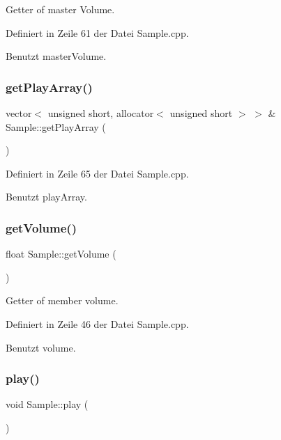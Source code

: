 Getter of master Volume. 



Definiert in Zeile 61 der Datei Sample.\+cpp.



Benutzt master\+Volume.

\mbox{\label{class_sample_a5728b28ce6f6ee19a1b84eddded4fa97}} 
\subsubsection{\texorpdfstring{get\+Play\+Array()}{getPlayArray()}}
{\footnotesize\ttfamily vector$<$ unsigned short, allocator$<$ unsigned short $>$ $>$ \& Sample\+::get\+Play\+Array (\begin{DoxyParamCaption}{ }\end{DoxyParamCaption})}



Definiert in Zeile 65 der Datei Sample.\+cpp.



Benutzt play\+Array.

\mbox{\label{class_sample_a9f3c251183832a53ec1967331d022575}} 
\subsubsection{\texorpdfstring{get\+Volume()}{getVolume()}}
{\footnotesize\ttfamily float Sample\+::get\+Volume (\begin{DoxyParamCaption}{ }\end{DoxyParamCaption})}



Getter of member volume. 



Definiert in Zeile 46 der Datei Sample.\+cpp.



Benutzt volume.

\mbox{\label{class_sample_a2ccc1c5571e54ba6725714cd795698f3}} 
\subsubsection{\texorpdfstring{play()}{play()}}
{\footnotesize\ttfamily void Sample\+::play (\begin{DoxyParamCaption}{ }\end{DoxyParamCaption})}



